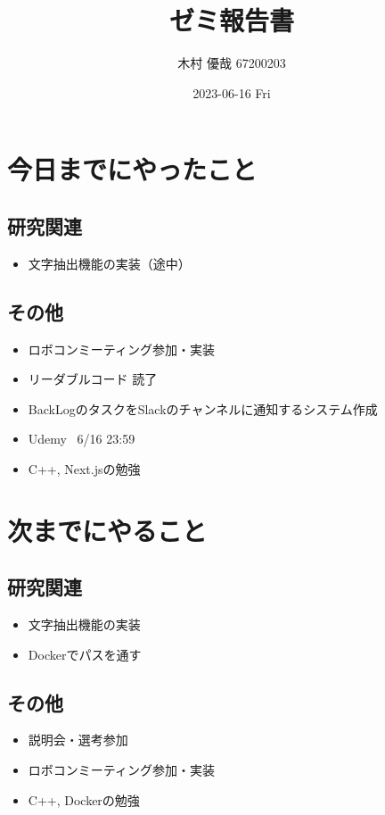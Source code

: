 \documentclass[uplatex, onecolumn, 10pt]{jsarticle}
\begin{document}
\title{\vspace{-40mm}\bf{\LARGE{ゼミ報告書}}}
\author{\vspace{-40mm}木村 優哉 67200203}
\date{2023-06-16 Fri}
\maketitle


\section{今日までにやったこと}

\subsection*{研究関連}
\begin{itemize}
	\item 文字抽出機能の実装（途中）
\end{itemize}

\subsection*{その他}
\begin{itemize}
	\item ロボコンミーティング参加・実装
	\item リーダブルコード 読了
	\item BackLogのタスクをSlackのチャンネルに通知するシステム作成
	\item Udemy ~6/16 23:59
	\item C++, Next.jsの勉強
\end{itemize}


\section{次までにやること}

\subsection*{研究関連}
\begin{itemize}
	\item 文字抽出機能の実装
	\item Dockerでパスを通す
\end{itemize}

\subsection*{その他}
\begin{itemize}
	\item 説明会・選考参加
	\item ロボコンミーティング参加・実装
	\item C++, Dockerの勉強
\end{itemize}
\end{document}
